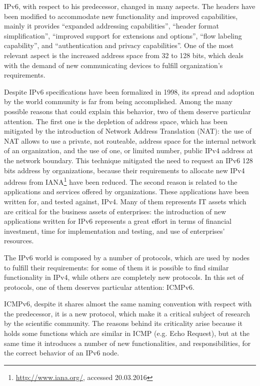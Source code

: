 \documentclass[12pt]{article}
\begin{document}
IPv6, with respect to his predecessor, changed in many aspects. The headers have been modified to accommodate new functionality and improved capabilities, mainly it provides ``expanded addressing capabilities'', ``header format simplification'', ``improved support for extensions and options'', ``flow labeling capability'', and ``authentication and privacy capabilities''. One of the most relevant aspect is the increased address space from 32 to 128 bits, which deals with the demand of new communicating devices to fulfill organization's requirements.\cite{rfc2460}

Despite IPv6 specifications have been formalized in 1998, its spread and adoption by the world community is far from being accomplished. Among the many possible reasons that could explain this behavior, two of them deserve particular attention. The first one is the depletion of address space, which has been mitigated by the introduction of Network Address Translation (NAT)\cite{rfc3022}: the use of NAT allows to use a private, not routeable, address space for the internal network of an organization, and the use of one, or limited number, public IPv4 address at the network boundary. This technique mitigated the need to request an IPv6 128 bits address by organizations, because their requirements to allocate new IPv4 address from IANA\footnote{\url{http://www.iana.org/}, accessed 20.03.2016} have been reduced. The second reason is related to the applications and services offered by organizations. These applications have been written for, and tested against, IPv4. Many of them represents IT assets which are critical for the business assets of enterprises: the introduction of new applications written for IPv6 represents a great effort in terms of financial investment, time for implementation and testing, and use of enterprises' resources.

The IPv6 world is composed by a number of protocols, which are used by nodes to fulfill their requirements: for some of them it is possible to find similar functionality in IPv4, while others are completely new protocols. In this set of protocols, one of them deserves particular attention: ICMPv6.

ICMPv6, despite it shares almost the same naming convention with respect with the predecessor, it is a new protocol, which make it a critical subject of research by the scientific community. The reasons behind its criticality arise because it holds some functions which are similar in ICMP (e.g. Echo Request), but at the same time it introduces a number of new functionalities, and responsibilities, for the correct behavior of an IPv6 node.
\end{document}
